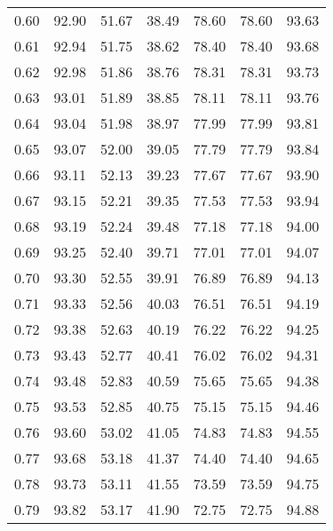 \begin{tabular}{|c|c|c|c|c|c|c|}
      0.60 &     92.90 &     51.67 &      38.49 &   78.60 &      78.60 &         93.63 \\
      0.61 &     92.94 &     51.75 &      38.62 &   78.40 &      78.40 &         93.68 \\
      0.62 &     92.98 &     51.86 &      38.76 &   78.31 &      78.31 &         93.73 \\
      0.63 &     93.01 &     51.89 &      38.85 &   78.11 &      78.11 &         93.76 \\
      0.64 &     93.04 &     51.98 &      38.97 &   77.99 &      77.99 &         93.81 \\
      0.65 &     93.07 &     52.00 &      39.05 &   77.79 &      77.79 &         93.84 \\
      0.66 &     93.11 &     52.13 &      39.23 &   77.67 &      77.67 &         93.90 \\
      0.67 &     93.15 &     52.21 &      39.35 &   77.53 &      77.53 &         93.94 \\
      0.68 &     93.19 &     52.24 &      39.48 &   77.18 &      77.18 &         94.00 \\
      0.69 &     93.25 &     52.40 &      39.71 &   77.01 &      77.01 &         94.07 \\
      0.70 &     93.30 &     52.55 &      39.91 &   76.89 &      76.89 &         94.13 \\
      0.71 &     93.33 &     52.56 &      40.03 &   76.51 &      76.51 &         94.19 \\
      0.72 &     93.38 &     52.63 &      40.19 &   76.22 &      76.22 &         94.25 \\
      0.73 &     93.43 &     52.77 &      40.41 &   76.02 &      76.02 &         94.31 \\
      0.74 &     93.48 &     52.83 &      40.59 &   75.65 &      75.65 &         94.38 \\
      0.75 &     93.53 &     52.85 &      40.75 &   75.15 &      75.15 &         94.46 \\
      0.76 &     93.60 &     53.02 &      41.05 &   74.83 &      74.83 &         94.55 \\
      0.77 &     93.68 &     53.18 &      41.37 &   74.40 &      74.40 &         94.65 \\
      0.78 &     93.73 &     53.11 &      41.55 &   73.59 &      73.59 &         94.75 \\
      0.79 &     93.82 &     53.17 &      41.90 &   72.75 &      72.75 &         94.88 \\

\end{tabular}
